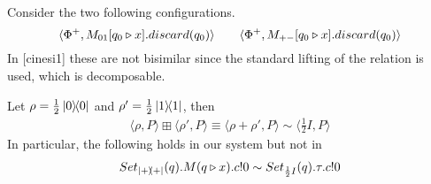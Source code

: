 
\begin{example}
	Consider the two following configurations.
	\[
		\langle\Phi^+, M_{01}[q_0 \triangleright x].discard(q_0)\rangle\qquad \langle\Phi^+, M_{+-}[q_0 \triangleright x].discard(q_0)\rangle	
	\]
	In [cinesi1] these are not bisimilar since the standard lifting of the relation is used, which is decomposable.
\end{example}


\begin{example}
Let $\rho = \frac{1}{2} \ket{0}\!\!\bra{0}$ and $\rho' = \frac{1}{2} \ket{1}\!\!\bra{1}$, then
\begin{align*}
	\langle \rho, P \rangle \boxplus \langle \rho', P \rangle \equiv \langle \rho + \rho', P \rangle \sim \langle \frac{1}{2} I, P \rangle
\end{align*}
In particular, the following holds in our system but not in~\cite{Feng:2012, Deng:2012}
\begin{align*}
	Set_{\ket{+}\!\!\bra{+}}(q).M(q \triangleright x).c!0 \sim Set_{\frac{1}{2} I}(q).\tau.c!0
\end{align*}
\end{example}

